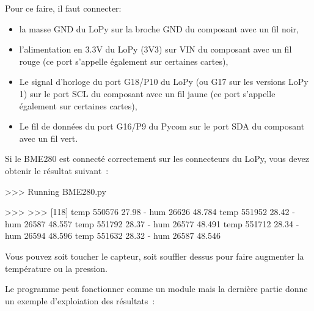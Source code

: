      \vspace{1em}

Pour ce faire, il faut connecter:
~\begin{itemize}
    \item la masse GND du LoPy sur la broche GND du composant avec un fil noir,
    \item l’alimentation en 3.3V du LoPy (3V3) sur VIN du composant avec un fil rouge (ce port s’appelle également  sur certaines cartes),
    \item Le signal d’horloge du port G18/P10 du LoPy (ou G17 sur les versions LoPy 1) sur le port SCL du composant avec un fil jaune (ce port s’appelle également  sur certaines cartes),
    \item Le fil de données du port G16/P9 du Pycom sur le port SDA du composant avec un fil vert.
\end{itemize}

Si le BME280 est connecté correctement sur les connecteurs du LoPy, vous devez obtenir le résultat suivant~:

\begin{termc}[backgroundcolor=\color{gray!10}, basicstyle=\ttfamily\tiny, escapechar=@]
>>> Running BME280.py

>>> 
>>> 
[118]
temp 550576 27.98  - hum 26626 48.784 %
temp 551952 28.42  - hum 26587 48.557 %
temp 551792 28.37  - hum 26577 48.491 %
temp 551712 28.34  - hum 26594 48.596 %
temp 551632 28.32  - hum 26587 48.546 %
\end{termc}

Vous pouvez soit toucher le capteur, soit souffler dessus pour faire augmenter la température ou la pression.

     \vspace{1em}


Le programme  peut fonctionner comme un module mais la dernière partie donne un exemple d'exploiation des résultats~:

